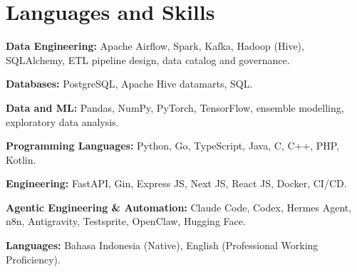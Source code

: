 \section{Languages and Skills}
\begin{cvskills}
  \item \textbf{Data Engineering:} Apache Airflow, Spark, Kafka, Hadoop (Hive), SQLAlchemy, ETL pipeline design, data catalog and governance.
  \item \textbf{Databases:} PostgreSQL, Apache Hive datamarts, SQL.
  \item \textbf{Data and ML:} Pandas, NumPy, PyTorch, TensorFlow, ensemble modelling, exploratory data analysis.
  \item \textbf{Programming Languages:} Python, Go, TypeScript, Java, C, C++, PHP, Kotlin.
  \item \textbf{Engineering:} FastAPI, Gin, Express JS, Next JS, React JS, Docker, CI/CD.
  \item \textbf{Agentic Engineering \& Automation:} Claude Code, Codex, Hermes Agent, n8n, Antigravity, Testsprite, OpenClaw, Hugging Face.
  \item \textbf{Languages:} Bahasa Indonesia (Native), English (Professional Working Proficiency).
\end{cvskills}
